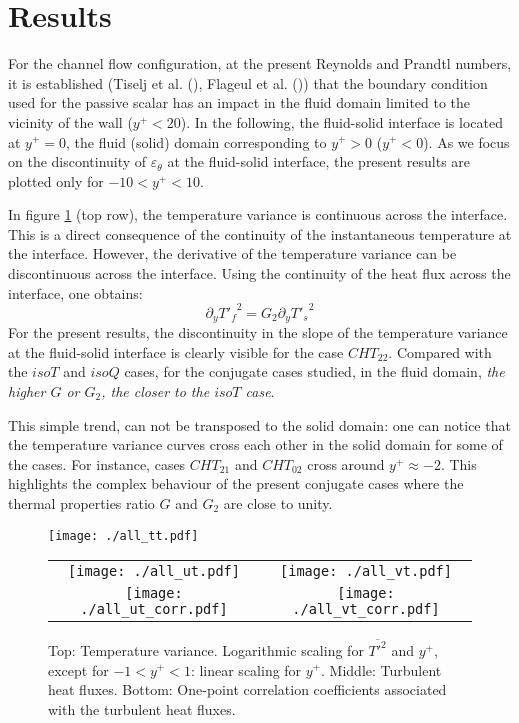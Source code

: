 \documentclass[review]{elsarticle}
\begin{document}
\section{Results}

For the channel flow configuration, at the present Reynolds and Prandtl numbers, it is established (Tiselj et al. (\cite{Tiselj2001dns}), Flageul et al. (\cite{flageul2015dns})) that the boundary condition used for the passive scalar has an impact in the fluid domain limited to the vicinity of the wall ($y^+ < 20$).
In the following, the fluid-solid interface is located at $y^+=0$, the fluid (solid) domain corresponding to $y^+ > 0$ ($y^+ < 0$).
As we focus on the discontinuity of $\varepsilon_\theta$ at the fluid-solid interface, the present results are plotted only for $-10 < y^+ < 10$.

In figure \ref{fig-ttutvt} (top row), the temperature variance is continuous across the interface.
This is a direct consequence of the continuity of the instantaneous temperature at the interface.
However, the derivative of the temperature variance can be discontinuous across the interface.
Using the continuity of the heat flux across the interface, one obtains:
\begin{equation}
\partial_y {T'_f}^2 = G_2 \partial_y {T'_s}^2
\end{equation}
For the present results, the discontinuity in the slope of the temperature variance at the fluid-solid interface is clearly visible for the case $CHT_{22}$.
Compared with the $isoT$ and $isoQ$ cases, for the conjugate cases studied, in the fluid domain, \textit{the higher $G$ or $G_2$, the closer to the $isoT$ case}.

This simple trend, can not be transposed to the solid domain: one can notice that the temperature variance curves cross each other in the solid domain for some of the cases.
For instance, cases $CHT_{21}$ and $CHT_{02}$ cross around $y^+ \approx -2$.
This highlights the complex behaviour of the present conjugate cases where the thermal properties ratio $G$ and $G_2$ are close to unity.

\begin{figure}[htbp]
\centering
\texttt{[image: ./all\_tt.pdf]}
\begin{tabular}{cc}
\texttt{[image: ./all\_ut.pdf]} &
\texttt{[image: ./all\_vt.pdf]} \\
\texttt{[image: ./all\_ut\_corr.pdf]} &
\texttt{[image: ./all\_vt\_corr.pdf]}
\end{tabular}
\caption{Top: Temperature variance. Logarithmic scaling for $\overline{T'^2}$ and $y^+$, except for $-1<y^+<1$: linear scaling for $y^+$. Middle: Turbulent heat fluxes. Bottom: One-point correlation coefficients associated with the turbulent heat fluxes.}
\label{fig-ttutvt}
\end{figure}
\end{document}
